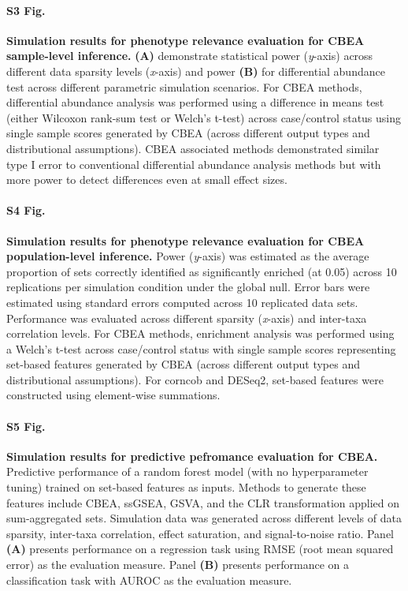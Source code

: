 \paragraph{S3 Fig.}
\label{S3_Fig}
{\bf Simulation results for phenotype relevance evaluation for CBEA sample-level inference.} \textbf{(A)} demonstrate statistical power (\emph{y}-axis) across different data sparsity levels (\emph{x}-axis) and power \textbf{(B)} for differential abundance test across different parametric simulation scenarios. For CBEA methods, differential abundance analysis was performed using a difference in means test (either Wilcoxon rank-sum test or Welch's t-test) across case/control status using single sample scores generated by CBEA (across different output types and distributional assumptions). CBEA associated methods demonstrated similar type I error to conventional differential abundance analysis methods but with more power to detect differences even at small effect sizes.

\paragraph{S4 Fig.}
\label{S4_Fig}
{\bf Simulation results for phenotype relevance evaluation for CBEA population-level inference.} Power (\emph{y}-axis) was estimated as the average proportion of sets correctly identified as significantly enriched (at 0.05) across 10 replications per simulation condition under the global null. Error bars were estimated using standard errors computed across 10 replicated data sets. Performance was evaluated across different sparsity (\emph{x}-axis) and inter-taxa correlation levels. For CBEA methods, enrichment analysis was performed using a Welch's t-test across case/control status with single sample scores representing set-based features generated by CBEA (across different output types and distributional assumptions). For corncob and DESeq2, set-based features were constructed using element-wise summations.

\paragraph{S5 Fig.}
\label{S5_Fig}
{\bf Simulation results for predictive pefromance evaluation for CBEA.} Predictive performance of a random forest model (with no hyperparameter tuning) trained on set-based features as inputs. Methods to generate these features include CBEA, ssGSEA, GSVA, and the CLR transformation applied on sum-aggregated sets. Simulation data was generated across different levels of data sparsity, inter-taxa correlation, effect saturation, and signal-to-noise ratio. Panel \textbf{(A)} presents performance on a regression task using RMSE (root mean squared error) as the evaluation measure. Panel \textbf{(B)} presents performance on a classification task with AUROC as the evaluation measure.  

